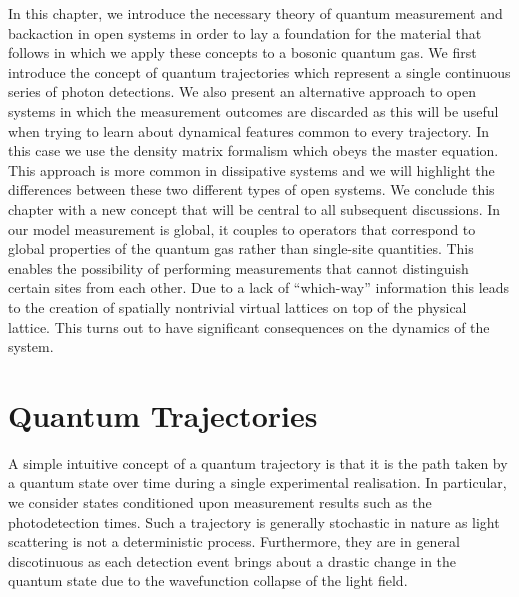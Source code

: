 In this chapter, we introduce the necessary theory of quantum
measurement and backaction in open systems in order to lay a
foundation for the material that follows in which we apply these
concepts to a bosonic quantum gas. We first introduce the concept of
quantum trajectories which represent a single continuous series of
photon detections. We also present an alternative approach to open
systems in which the measurement outcomes are discarded as this will
be useful when trying to learn about dynamical features common to
every trajectory. In this case we use the density matrix formalism
which obeys the master equation. This approach is more common in
dissipative systems and we will highlight the differences between
these two different types of open systems. We conclude this chapter
with a new concept that will be central to all subsequent
discussions. In our model measurement is global, it couples to
operators that correspond to global properties of the quantum gas
rather than single-site quantities. This enables the possibility of
performing measurements that cannot distinguish certain sites from
each other. Due to a lack of ``which-way'' information this leads to
the creation of spatially nontrivial virtual lattices on top of the
physical lattice. This turns out to have significant consequences on
the dynamics of the system.

\section{Quantum Trajectories}

A simple intuitive concept of a quantum trajectory is that it is the
path taken by a quantum state over time during a single experimental
realisation. In particular, we consider states conditioned upon
measurement results such as the photodetection times. Such a
trajectory is generally stochastic in nature as light scattering is
not a deterministic process. Furthermore, they are in general
discotinuous as each detection event brings about a drastic change in
the quantum state due to the wavefunction collapse of the light field.

